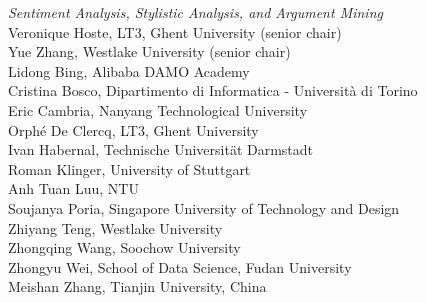 \emph{Sentiment Analysis, Stylistic Analysis, and Argument Mining} \\
\hspace*{0.2in} Veronique Hoste, LT3, Ghent University (senior chair)\\
\hspace*{0.2in} Yue Zhang, Westlake University (senior chair)\\
\hspace*{0.2in} Lidong Bing, Alibaba DAMO Academy\\
\hspace*{0.2in} Cristina Bosco, Dipartimento di Informatica - Università di Torino\\
\hspace*{0.2in} Eric Cambria, Nanyang Technological University\\
\hspace*{0.2in} Orph\'e De Clercq, LT3, Ghent University\\
\hspace*{0.2in} Ivan Habernal, Technische Universität Darmstadt\\
\hspace*{0.2in} Roman Klinger, University of Stuttgart\\
\hspace*{0.2in} Anh Tuan Luu, NTU\\
\hspace*{0.2in} Soujanya Poria, Singapore University of Technology and Design\\
\hspace*{0.2in} Zhiyang Teng, Westlake University\\
\hspace*{0.2in} Zhongqing Wang, Soochow University\\
\hspace*{0.2in} Zhongyu Wei, School of Data Science, Fudan University\\
\hspace*{0.2in} Meishan Zhang, Tianjin University, China\\

